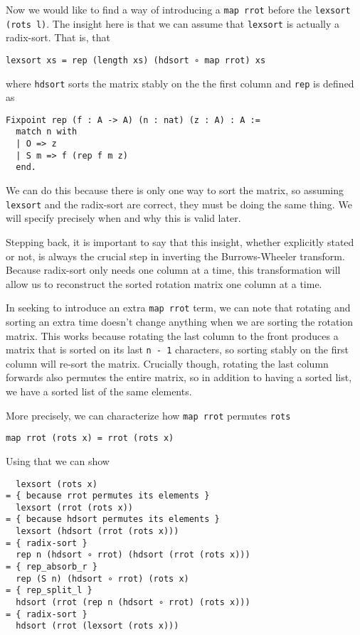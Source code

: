 \documentclass[11pt]{thesis}
\begin{document}
Now we would like to find a way of introducing a \verb|map rrot|
before the \verb|lexsort (rots l)|. The insight here is that we can
assume that \verb|lexsort| is actually a radix-sort. That is, that
\begin{verbatim}
lexsort xs = rep (length xs) (hdsort ∘ map rrot) xs
\end{verbatim}
where \verb|hdsort| sorts the matrix stably on the the first column
and \verb|rep| is defined as
\begin{verbatim}
Fixpoint rep (f : A -> A) (n : nat) (z : A) : A :=
  match n with
  | O => z
  | S m => f (rep f m z)
  end.
\end{verbatim}

We can do this because there is only one way to sort the matrix, so
assuming \verb|lexsort| and the radix-sort are correct, they must be
doing the same thing. We will specify precisely when and why this is
valid later.

Stepping back, it is important to say that this insight, whether
explicitly stated or not, is always the crucial step in inverting the
Burrows-Wheeler transform. Because radix-sort only needs one column at
a time, this transformation will allow us to reconstruct the sorted
rotation matrix one column at a time.

In seeking to introduce an extra \verb|map rrot| term, we can note
that rotating and sorting an extra time doesn't change anything when
we are sorting the rotation matrix. This works because rotating the
last column to the front produces a matrix that is sorted on its last
\verb|n - 1| characters, so sorting stably on the first column will
re-sort the matrix. Crucially though, rotating the last column
forwards also permutes the entire matrix, so in addition to having a
sorted list, we have a sorted list of the same elements.

More precisely, we can characterize how \verb|map rrot| permutes
\verb|rots|
\begin{verbatim}
map rrot (rots x) = rrot (rots x)
\end{verbatim}

Using that we can show
\begin{verbatim}
  lexsort (rots x)
= { because rrot permutes its elements }
  lexsort (rrot (rots x))
= { because hdsort permutes its elements }
  lexsort (hdsort (rrot (rots x)))
= { radix-sort }
  rep n (hdsort ∘ rrot) (hdsort (rrot (rots x)))
= { rep_absorb_r }
  rep (S n) (hdsort ∘ rrot) (rots x)
= { rep_split_l }
  hdsort (rrot (rep n (hdsort ∘ rrot) (rots x)))
= { radix-sort }
  hdsort (rrot (lexsort (rots x)))
\end{verbatim}
\end{document}
